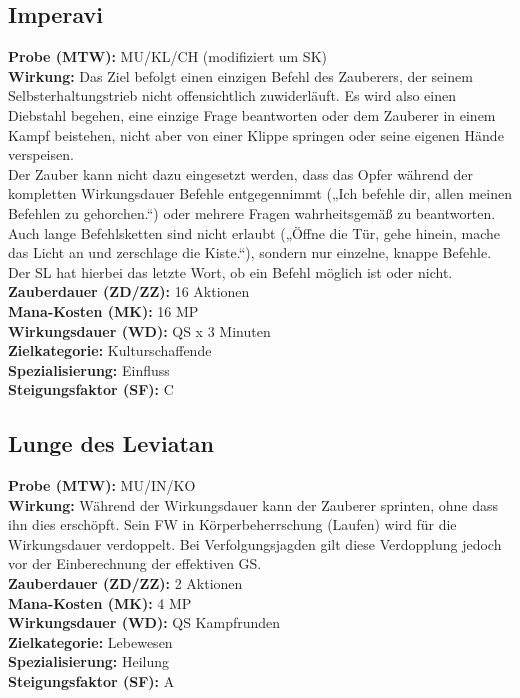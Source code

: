 \subsection{Imperavi}
\label{chap:imperavi}
\textbf{Probe (MTW):} MU/KL/CH (modifiziert um SK) \\
\textbf{Wirkung:} Das Ziel befolgt einen einzigen Befehl des Zauberers, der seinem Selbsterhaltungstrieb nicht offensichtlich zuwiderläuft. Es wird also einen Diebstahl begehen, eine einzige Frage beantworten oder dem Zauberer in einem Kampf beistehen, nicht aber von einer Klippe springen oder seine eigenen Hände verspeisen.\\
Der Zauber kann nicht dazu eingesetzt werden, dass das Opfer während der kompletten Wirkungsdauer Befehle entgegennimmt („Ich befehle dir, allen meinen Befehlen zu gehorchen.“) oder mehrere Fragen wahrheitsgemäß zu beantworten. Auch lange Befehlsketten sind nicht erlaubt („Öffne die Tür, gehe hinein, mache das Licht an und zerschlage die Kiste.“), sondern nur einzelne, knappe Befehle. Der SL hat hierbei das letzte Wort, ob ein Befehl möglich ist oder nicht.\\
\textbf{Zauberdauer (ZD/ZZ):} 16 Aktionen \\
\textbf{Mana-Kosten (MK):} 16 MP \\
\textbf{Wirkungsdauer (WD):} QS x 3 Minuten \\
\textbf{Zielkategorie:} Kulturschaffende \\
\textbf{Spezialisierung:} Einfluss \\
\textbf{Steigungsfaktor (SF):} C


\subsection{Lunge des Leviatan}
\label{chap:lunge_des_leviatan}
\textbf{Probe (MTW):} MU/IN/KO \\
\textbf{Wirkung:} Während der Wirkungsdauer kann der Zauberer sprinten, ohne dass ihn dies erschöpft. Sein FW in Körperbeherrschung (Laufen) wird für die Wirkungsdauer verdoppelt. Bei Verfolgungsjagden gilt diese Verdopplung jedoch vor der Einberechnung der effektiven GS.\\
\textbf{Zauberdauer (ZD/ZZ):} 2 Aktionen \\
\textbf{Mana-Kosten (MK):} 4 MP \\
\textbf{Wirkungsdauer (WD):} QS Kampfrunden \\
\textbf{Zielkategorie:} Lebewesen \\
\textbf{Spezialisierung:} Heilung \\
\textbf{Steigungsfaktor (SF):} A


